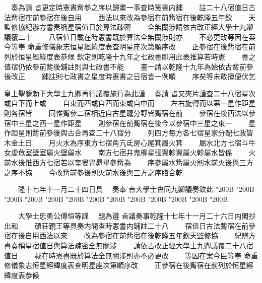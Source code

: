 \begin{正文}
　奏為請
㫖更定時憲書觜參之序以歸畫一事查時憲書内鋪
　　註二十八宿值日古法觜宿在前參宿在後自用
　　西法以來改為參宿在前觜宿在後乾隆五年欽
　　天監修協紀辦方書奏稱星宿值日於算法疎密
　　全無關涉請依古改正經大學士九卿議覆二十
　　八宿值日載在時憲書既於算法全無關涉則亦
　　不必更改等因在案今等奉
命重修儀象志恒星經緯度表查明星座次第順序改
　　正參宿在後觜宿在前列於恒星經緯度表恭候
欽定則乾隆十九年之七政書即用此表推算若時憲
　　書之值宿仍依參前觜後鋪註則與七政書不能
　　畫一請以乾隆十九年為始依古觜前參後改正
　　鋪註則七政書之星度時憲書之日宿皆一例順
　　序矣等未敢擅便伏乞
\par
皇上聖鑒勅下大學士九卿再行議覆施行為此謹
　奏請
㫖又夾片謹查二十八宿星次或自下而上或
　　自東而西或自西而東或自中而
　　左右旋轉而以第一星作距星則各宿皆
　　同惟觜參二宿相近自古星躔分野皆觜宿在前
　　參宿在後西法以參宿中三星之西一星作距星
　　則參宿在前觜宿在後今以參宿中三星之東一
　　星作距星則觜前參後與古合再查二十八宿分
　　列四方每方各七宿星家分配七政皆木金土日
　　月火水為序東方七宿角亢氐房心尾箕屬火箕
　　屬水北方七宿斗牛女虚危室壁室屬火壁屬水
　　南方七宿井鬼柳星張翼軫翼屬火軫屬水皆係
　　火前水後惟西方七宿若以奎婁胃昴畢參觜為
　　序參屬水觜屬火則水前火後與三方之序不協
　　今改觜前參後則火前水後與三方之序脗合乾
\par
　　隆十七年十一月二十四日具
　奏奉
㫖大學士㑹同九卿議奏欽此
\char"200B\relax{}
\char"200B\relax{}
\char"200B\relax{}
\char"200B\relax{}
\char"200B\relax{}
\char"200B\relax{}
\char"200B\relax{}
\char"200B\relax{}
\char"200B\relax{}
\char"200B\relax{}
\char"200B\relax{}
\char"200B\relax{}
\char"200B\relax
\par
　　大學士忠勇公傅恒等謹
　題為遵
㫖議奏事乾隆十七年十一月二十六日内閣抄出和
　　碩荘親王等具奏内開查時憲書内鋪註二十八
　　宿值日古法觜宿在前參宿在後自用西法以來
　　改為參宿在前觜宿在後乾隆五年欽天監修協
　　紀辨方書奏稱星宿值日與算法疎密全無關涉
　　請依古改正經大學士九卿議覆二十八宿值日
　　載在時憲書既於算法全無關涉則亦不必更改
　　等因在案今臣等奉
命重修儀象志恒星經緯度表查明星座次第順序改
　　正參宿在後觜宿在前列於恒星經緯度表恭候

\end{正文}

